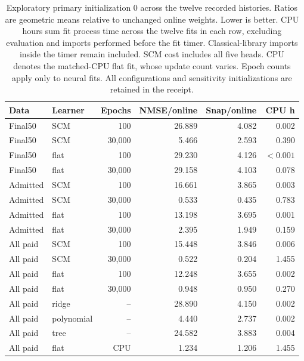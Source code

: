 \begin{table}[ht]
\centering\small
\begin{tabular}{llrrrr}
\toprule
Data & Learner & Epochs & NMSE/online & Snap/online & CPU h\\
\midrule
Final50 & SCM & 100 & 26.889 & 4.082 & 0.002\\
Final50 & SCM & 30,000 & 5.466 & 2.593 & 0.390\\
Final50 & flat & 100 & 29.230 & 4.126 & $<0.001$\\
Final50 & flat & 30,000 & 29.158 & 4.103 & 0.078\\
Admitted & SCM & 100 & 16.661 & 3.865 & 0.003\\
Admitted & SCM & 30,000 & 0.533 & 0.435 & 0.783\\
Admitted & flat & 100 & 13.198 & 3.695 & 0.001\\
Admitted & flat & 30,000 & 2.395 & 1.949 & 0.159\\
All paid & SCM & 100 & 15.448 & 3.846 & 0.006\\
All paid & SCM & 30,000 & 0.522 & 0.204 & 1.455\\
All paid & flat & 100 & 12.248 & 3.655 & 0.002\\
All paid & flat & 30,000 & 0.948 & 0.950 & 0.270\\
All paid & ridge & -- & 28.890 & 4.150 & 0.002\\
All paid & polynomial & -- & 4.440 & 2.737 & 0.002\\
All paid & tree & -- & 24.582 & 3.883 & 0.004\\
All paid & flat & CPU & 1.234 & 1.206 & 1.455\\
\bottomrule
\end{tabular}
\caption{Exploratory primary initialization 0 across the twelve recorded histories. Ratios are geometric means relative to unchanged online weights. Lower is better. CPU hours sum fit process time across the twelve fits in each row, excluding evaluation and imports performed before the fit timer. Classical-library imports inside the timer remain included. SCM cost includes all five heads. CPU denotes the matched-CPU flat fit, whose update count varies. Epoch counts apply only to neural fits. All configurations and sensitivity initializations are retained in the receipt.}
\label{tab:attribution}
\end{table}

